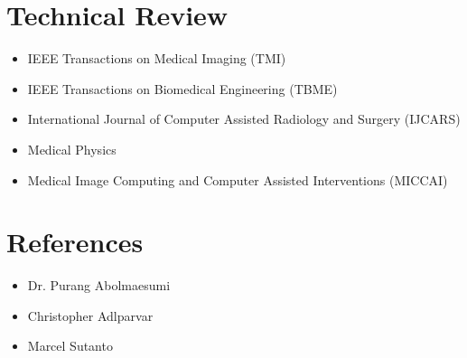 \documentclass[letterpaper,11pt]{article}
\newcommand{\reviewItem}[1]{
  \item\small{#1 \vspace{-2pt}}
}
\newcommand{\resumeSubHeadingListStart}{\begin{itemize}[leftmargin=*]}
\newcommand{\resumeSubHeadingListEnd}{\end{itemize}}
\begin{document}
\section{Technical Review}
  \resumeSubHeadingListStart
    \reviewItem{IEEE Transactions on Medical Imaging (TMI)}
    \reviewItem{IEEE Transactions on Biomedical Engineering (TBME)}
    \reviewItem{International Journal of Computer Assisted Radiology and Surgery (IJCARS)}
    \reviewItem{Medical Physics}
    \reviewItem{Medical Image Computing and Computer Assisted Interventions (MICCAI)}
  \resumeSubHeadingListEnd

  \section{References}
    \resumeSubHeadingListStart
      \reviewItem{Dr. Purang Abolmaesumi}
      \reviewItem{Christopher Adlparvar}
      \reviewItem{Marcel Sutanto}
    \resumeSubHeadingListEnd
\end{document}
